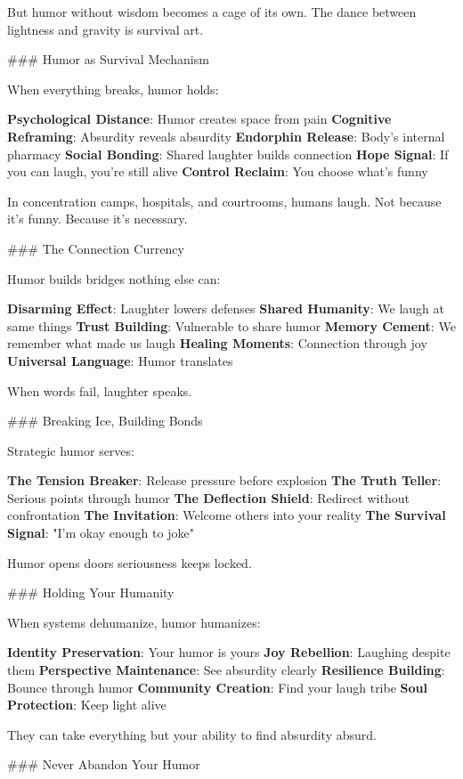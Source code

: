 \documentclass[12pt]{book}
\begin{document}
But humor without wisdom becomes a cage of its own. The dance between lightness and gravity is survival art.

\#\#\# Humor as Survival Mechanism

When everything breaks, humor holds:

\textbf{Psychological Distance}: Humor creates space from pain
\textbf{Cognitive Reframing}: Absurdity reveals absurdity
\textbf{Endorphin Release}: Body's internal pharmacy
\textbf{Social Bonding}: Shared laughter builds connection
\textbf{Hope Signal}: If you can laugh, you're still alive
\textbf{Control Reclaim}: You choose what's funny

In concentration camps, hospitals, and courtrooms, humans laugh. Not because it's funny. Because it's necessary.

\#\#\# The Connection Currency

Humor builds bridges nothing else can:

\textbf{Disarming Effect}: Laughter lowers defenses
\textbf{Shared Humanity}: We laugh at same things
\textbf{Trust Building}: Vulnerable to share humor
\textbf{Memory Cement}: We remember what made us laugh
\textbf{Healing Moments}: Connection through joy
\textbf{Universal Language}: Humor translates

When words fail, laughter speaks.

\#\#\# Breaking Ice, Building Bonds

Strategic humor serves:

\textbf{The Tension Breaker}: Release pressure before explosion
\textbf{The Truth Teller}: Serious points through humor
\textbf{The Deflection Shield}: Redirect without confrontation
\textbf{The Invitation}: Welcome others into your reality
\textbf{The Survival Signal}: "I'm okay enough to joke"

Humor opens doors seriousness keeps locked.

\#\#\# Holding Your Humanity

When systems dehumanize, humor humanizes:

\textbf{Identity Preservation}: Your humor is yours
\textbf{Joy Rebellion}: Laughing despite them
\textbf{Perspective Maintenance}: See absurdity clearly
\textbf{Resilience Building}: Bounce through humor
\textbf{Community Creation}: Find your laugh tribe
\textbf{Soul Protection}: Keep light alive

They can take everything but your ability to find absurdity absurd.

\#\#\# Never Abandon Your Humor
\end{document}
